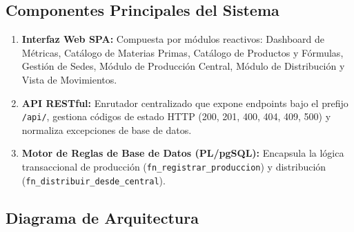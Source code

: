 \documentclass[11pt,a4paper]{article}
\begin{document}
\subsection{Componentes Principales del Sistema}
\begin{enumerate}
    \item \textbf{Interfaz Web SPA:} Compuesta por módulos reactivos: Dashboard de Métricas, Catálogo de Materias Primas, Catálogo de Productos y Fórmulas, Gestión de Sedes, Módulo de Producción Central, Módulo de Distribución y Vista de Movimientos.
    \item \textbf{API RESTful:} Enrutador centralizado que expone endpoints bajo el prefijo \texttt{/api/}, gestiona códigos de estado HTTP (200, 201, 400, 404, 409, 500) y normaliza excepciones de base de datos.
    \item \textbf{Motor de Reglas de Base de Datos (PL/pgSQL):} Encapsula la lógica transaccional de producción (\texttt{fn\_registrar\_produccion}) y distribución (\texttt{fn\_distribuir\_desde\_central}).
\end{enumerate}

\newpage
\subsection{Diagrama de Arquitectura}
\end{document}
